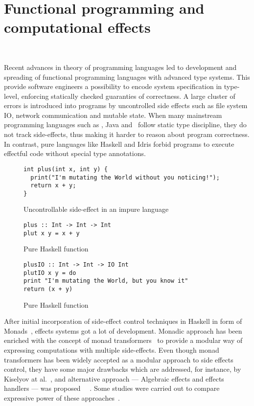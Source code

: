 \chapter{Functional programming and computational effects}
~\label{cpt-effects}

Recent advances in theory of programming languages led to development and spreading
of functional programming languages with advanced type systems. This provide
software engineers a possibility to encode system specification in type-level, enforcing
statically checked guaranties of correctness. A large cluster of errors is
introduced into programs by uncontrolled side effects such as file system IO,
network communication and mutable state. When many mainstream programming languages such as \cpp,
Java and \cs~follow static type discipline, they do not track
side-effects, thus making it harder to reason about program correctness. In contrast,
pure languages like Haskell and Idris forbid programs to execute effectful code
without special type annotations.

\begin{figure}[h]
\begin {lstlisting}
int plus(int x, int y) {
  print("I'm mutating the World without you noticing!");
  return x + y;
}
\end{lstlisting}
\caption{Uncontrollable side-effect in an impure language}
\label{listing:effectfulPlus}
\end{figure}

\begin{figure}[h]
\begin{lstlisting}
plus :: Int -> Int -> Int
plut x y = x + y
\end{lstlisting}
\caption{Pure Haskell function}
\label{listing:purePlusHaskell}
\end{figure}

\begin{figure}[h]
\begin{lstlisting}
plusIO :: Int -> Int -> IO Int
plutIO x y = do
print "I'm mutating the World, but you know it"
return (x + y)
\end{lstlisting}
\caption{Pure Haskell function}
\label{listing:purePlusHaskell}
\end{figure}

After initial incorporation of side-effect control techniques in Haskell in
form of Monads~\cite{Wadler:1992:EFP:143165.143169}, effects systems got a lot
of development. Monadic approach has been enriched with the concept of monad
transformers~\cite{Liang:1995:MTM:199448.199528} to provide a modular way of
expressing computations with multiple side-effects. Even though monad
transformers has been widely accepted as a modular approach to side effects control,
they have some major drawbacks which are addressed, for instance, by Kiselyov at al.~\cite{Kiselyov:2013:EEA:2578854.2503791}, and alternative approach --- Algebraic effects and effects handlers --- was proposed~\cite{DBLP:journals/jlp/BauerP15}
~\cite{Kiselyov:2013:EEA:2578854.2503791}. Some studies were carried out to
compare expressive power of these approaches~\cite{DBLP:journals/corr/ForsterKLP16}.

